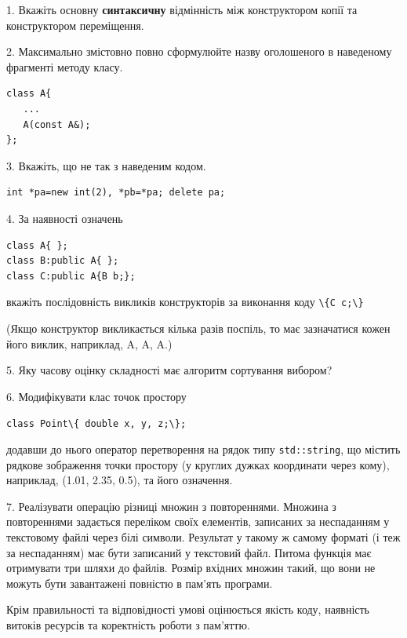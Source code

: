 \documentclass[12pt, ukrainian]{article}
\def\code#1{\Verb!#1!}
\begin{document}
{%
1. Вкажіть основну \textbf{синтаксичну} відмінність між конструктором копії та конструктором переміщення.%
\par
\vspace{2mm}
2. Максимально змістовно повно сформулюйте назву оголошеного в наведеному фрагменті методу класу.
\vspace{-3mm}
\begin{verbatim}class A{
   ...
   A(const A&);
};\end{verbatim}
\vspace{-3mm}
\par
\vspace{2mm}
3. Вкажіть, що не так з наведеним кодом.
\vspace{-3mm}
\begin{verbatim}int *pa=new int(2), *pb=*pa; delete pa;\end{verbatim}
\vspace{-3mm}
\par
\vspace{2mm}
4. За наявності означень
\vspace{-3mm}
\begin{verbatim}
class A{ };
class B:public A{ };
class C:public A{B b;};\end{verbatim}
\vspace{-3mm}
вкажіть послідовність викликів конструкторів за виконання коду \code{\{C c;\}} 

(Якщо конструктор викликається кілька разів поспіль, то має зазначатися кожен його виклик, наприклад, A, A, A.)

\vspace{2mm}
5. Яку часову оцінку складності має алгоритм сортування вибором?
\par
\vspace{2mm}
6. Модифікувати клас точок простору 

\qquad\code{class Point\{ double x, y, z;\};}


додавши до нього оператор перетворення на рядок типу \code{std::string}, що містить рядкове зображення точки простору (у круглих дужках координати через кому), наприклад, (1.01, 2.35, 0.5), та його означення.%
\par
\vspace{2mm}
7. 
Реалізувати операцію різниці множин з повтореннями. Множина з повтореннями задається переліком своїх елементів, записаних за неспаданням у текстовому файлі через білі символи. Результат у такому ж самому форматі (і теж за неспаданням) має бути записаний у текстовий файл. Питома функція має отримувати три шляхи до файлів. Розмір вхідних множин такий, що вони не можуть бути завантажені повністю в пам’ять програми.

Крім правильності та відповідності умові оцінюється якість коду, наявність витоків ресурсів та коректність роботи з пам'яттю. 

}
\end{document}
